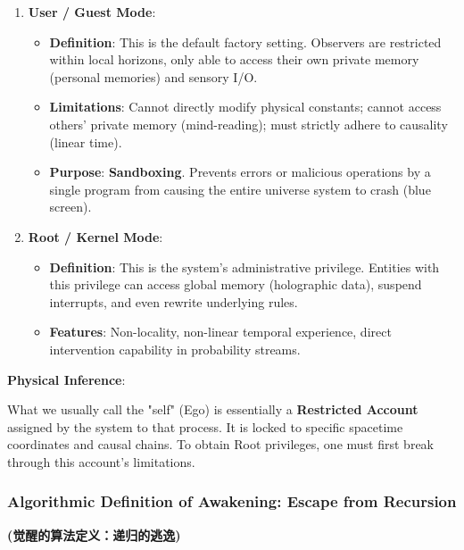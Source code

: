 \begin{enumerate}
\item \textbf{User / Guest Mode}:

      \begin{itemize}
      \item \textbf{Definition}: This is the default factory setting. Observers are restricted within local horizons, only able to access their own private memory (personal memories) and sensory I/O.

      \item \textbf{Limitations}: Cannot directly modify physical constants; cannot access others' private memory (mind-reading); must strictly adhere to causality (linear time).

      \item \textbf{Purpose}: \textbf{Sandboxing}. Prevents errors or malicious operations by a single program from causing the entire universe system to crash (blue screen).
      \end{itemize}

\item \textbf{Root / Kernel Mode}:

      \begin{itemize}
      \item \textbf{Definition}: This is the system's administrative privilege. Entities with this privilege can access global memory (holographic data), suspend interrupts, and even rewrite underlying rules.

      \item \textbf{Features}: Non-locality, non-linear temporal experience, direct intervention capability in probability streams.
      \end{itemize}
\end{enumerate}

\textbf{Physical Inference}:

What we usually call the "self" (Ego) is essentially a \textbf{Restricted Account} assigned by the system to that process. It is locked to specific spacetime coordinates and causal chains. To obtain Root privileges, one must first break through this account's limitations.

\subsubsection{Algorithmic Definition of Awakening: Escape from Recursion}

\textbf{(觉醒的算法定义：递归的逃逸)}


